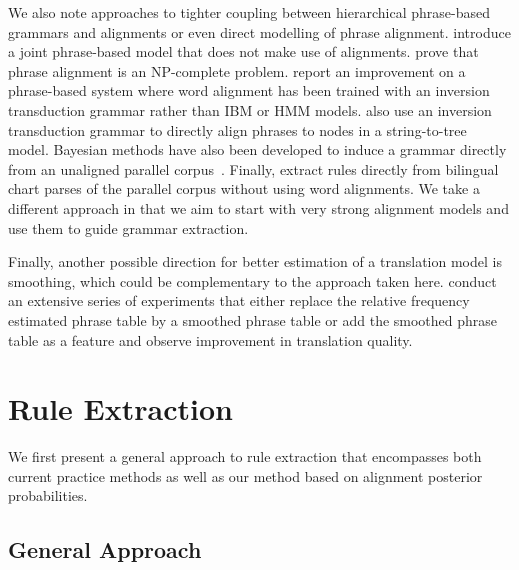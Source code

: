 We also note approaches to tighter coupling between hierarchical phrase-based
grammars and alignments or even direct modelling of phrase alignment.
\citet{marcu-wong:2002:EMNLP} introduce a joint phrase-based model that
does not make use of alignments.
\citet{denero-klein:2008:ACL} prove that phrase alignment is an
NP-complete problem. \citet{saers-wu:2009:SSST} report an
improvement on a phrase-based system where word alignment has been trained with
an inversion transduction grammar rather than IBM or HMM models.
\citet{pauls-klein-chiang-knight:2010:NAACL} also use an
inversion transduction grammar to directly align phrases to nodes in a
string-to-tree model. Bayesian methods have also been developed to induce a
grammar directly from an unaligned parallel
corpus~\citep{blunsom-cohn-osborne:2008:NIPS,blunsom-cohn-dyer-osborne:2009:ACL}.
Finally, \citet{Cmejrek2009} extract rules directly from
bilingual chart parses of the parallel corpus without using word alignments.
We take a different approach in that we aim to start with very strong alignment
models and use them to guide grammar extraction.

Finally, another possible direction for better estimation of a translation model
is smoothing, which could be complementary to the approach taken here.
\citet{foster-kuhn-johnson:2006:EMNLP} conduct an extensive series of
experiments that either replace the relative frequency estimated phrase table by
a smoothed phrase table or add the smoothed phrase table as a feature and
observe improvement in translation quality.

\section{Rule Extraction}
\label{sec:extractionFromPosteriorsExtraction}

We first present a general approach to rule extraction that encompasses both
current practice methods as well as our method based on alignment posterior
probabilities.

\subsection{General Approach}
\label{sec:extractionFromPosteriorsExtractionGeneralApproach}

